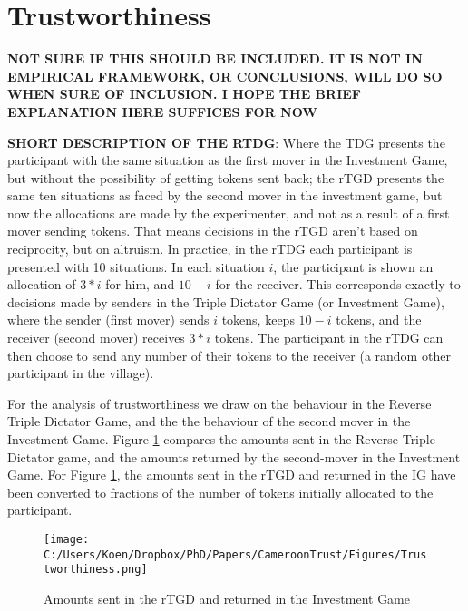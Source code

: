 \section{Trustworthiness}
\textbf{NOT SURE IF THIS SHOULD BE INCLUDED. IT IS NOT IN EMPIRICAL FRAMEWORK, OR CONCLUSIONS, WILL DO SO WHEN SURE OF INCLUSION. I HOPE THE BRIEF EXPLANATION HERE SUFFICES FOR NOW}

\textbf{SHORT DESCRIPTION OF THE RTDG}: Where the TDG presents the participant with the same situation as the first mover in the Investment Game, but without the possibility of getting tokens sent back; the rTGD presents the same ten situations as faced by the second mover in the investment game, but now the allocations are made by the experimenter, and not as a result of a first mover sending tokens. That means decisions in the rTGD aren't based on reciprocity, but on altruism. In practice, in the rTDG each participant is presented with 10 situations. In each situation $i$, the participant is shown an allocation of $3*i$ for him, and $10-i$ for the receiver. This corresponds exactly to decisions made by senders in the Triple Dictator Game (or Investment Game), where the sender (first mover) sends $i$ tokens, keeps $10-i$ tokens, and the receiver (second mover) receives $3*i$ tokens. The participant in the rTDG can then choose to send any number of their tokens to the receiver (a random other participant in the village). 

For the analysis of trustworthiness we draw on the behaviour in the Reverse Triple Dictator Game, and the the behaviour of the second mover in the Investment Game. Figure \ref{fig:tw} compares the amounts sent in the Reverse Triple Dictator game, and the amounts returned by the second-mover in the Investment Game. 
For Figure \ref{fig:tw}, the amounts sent in the rTGD and returned in the IG have been converted to fractions of the number of tokens initially allocated to the participant.

\begin{figure}[htb]
  \texttt{[image: C:/Users/Koen/Dropbox/PhD/Papers/CameroonTrust/Figures/Trustworthiness.png]}
  \caption{Amounts sent in the rTGD and returned in the Investment Game}
  \label{fig:tw}
\end{figure}

